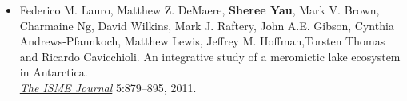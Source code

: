 \begin{itemize}
\item Federico M. Lauro, Matthew Z. DeMaere, \textbf{Sheree Yau}, Mark V. Brown, Charmaine Ng, David Wilkins, Mark J. Raftery, John A.E. Gibson, Cynthia Andrews-Pfannkoch, Matthew Lewis, Jeffrey M. Hoffman,Torsten Thomas and Ricardo Cavicchioli. 
An integrative study of a meromictic lake ecosystem in Antarctica. \\
\emph{\underline{The ISME Journal}}
5:879--895, 2011.

\end{itemize}


